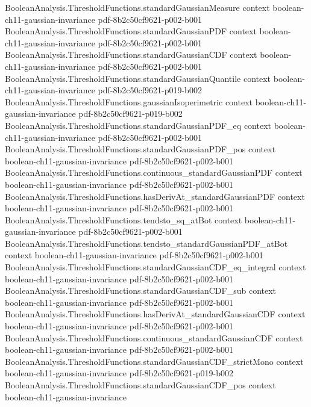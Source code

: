 \begin{theorem}
\proofstep
  {BooleanAnalysis.ThresholdFunctions.standardGaussianMeasure}
  {context}
  {boolean-ch11-gaussian-invariance}
  {pdf-8b2c50cf9621-p002-b001}
\proofstep
  {BooleanAnalysis.ThresholdFunctions.standardGaussianPDF}
  {context}
  {boolean-ch11-gaussian-invariance}
  {pdf-8b2c50cf9621-p002-b001}
\proofstep
  {BooleanAnalysis.ThresholdFunctions.standardGaussianCDF}
  {context}
  {boolean-ch11-gaussian-invariance}
  {pdf-8b2c50cf9621-p002-b001}
\proofstep
  {BooleanAnalysis.ThresholdFunctions.standardGaussianQuantile}
  {context}
  {boolean-ch11-gaussian-invariance}
  {pdf-8b2c50cf9621-p019-b002}
\proofstep
  {BooleanAnalysis.ThresholdFunctions.gaussianIsoperimetric}
  {context}
  {boolean-ch11-gaussian-invariance}
  {pdf-8b2c50cf9621-p019-b002}
\proofstep
  {BooleanAnalysis.ThresholdFunctions.standardGaussianPDF_eq}
  {context}
  {boolean-ch11-gaussian-invariance}
  {pdf-8b2c50cf9621-p002-b001}
\proofstep
  {BooleanAnalysis.ThresholdFunctions.standardGaussianPDF_pos}
  {context}
  {boolean-ch11-gaussian-invariance}
  {pdf-8b2c50cf9621-p002-b001}
\proofstep
  {BooleanAnalysis.ThresholdFunctions.continuous_standardGaussianPDF}
  {context}
  {boolean-ch11-gaussian-invariance}
  {pdf-8b2c50cf9621-p002-b001}
\proofstep
  {BooleanAnalysis.ThresholdFunctions.hasDerivAt_standardGaussianPDF}
  {context}
  {boolean-ch11-gaussian-invariance}
  {pdf-8b2c50cf9621-p002-b001}
\proofstep
  {BooleanAnalysis.ThresholdFunctions.tendsto_sq_atBot}
  {context}
  {boolean-ch11-gaussian-invariance}
  {pdf-8b2c50cf9621-p002-b001}
\proofstep
  {BooleanAnalysis.ThresholdFunctions.tendsto_standardGaussianPDF_atBot}
  {context}
  {boolean-ch11-gaussian-invariance}
  {pdf-8b2c50cf9621-p002-b001}
\proofstep
  {BooleanAnalysis.ThresholdFunctions.standardGaussianCDF_eq_integral}
  {context}
  {boolean-ch11-gaussian-invariance}
  {pdf-8b2c50cf9621-p002-b001}
\proofstep
  {BooleanAnalysis.ThresholdFunctions.standardGaussianCDF_sub}
  {context}
  {boolean-ch11-gaussian-invariance}
  {pdf-8b2c50cf9621-p002-b001}
\proofstep
  {BooleanAnalysis.ThresholdFunctions.hasDerivAt_standardGaussianCDF}
  {context}
  {boolean-ch11-gaussian-invariance}
  {pdf-8b2c50cf9621-p002-b001}
\proofstep
  {BooleanAnalysis.ThresholdFunctions.continuous_standardGaussianCDF}
  {context}
  {boolean-ch11-gaussian-invariance}
  {pdf-8b2c50cf9621-p002-b001}
\proofstep
  {BooleanAnalysis.ThresholdFunctions.standardGaussianCDF_strictMono}
  {context}
  {boolean-ch11-gaussian-invariance}
  {pdf-8b2c50cf9621-p019-b002}
\proofstep
  {BooleanAnalysis.ThresholdFunctions.standardGaussianCDF_pos}
  {context}
  {boolean-ch11-gaussian-invariance}

\end{theorem}
